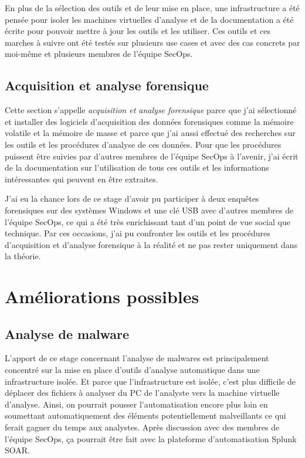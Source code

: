 En plus de la sélection des outils et de leur mise en place, une infrastructure a été pensée pour isoler les machines virtuelles d'analyse et de la documentation a été écrite pour pouvoir mettre à jour les outils et les utiliser. Ces outils et ces marches à suivre ont été testés sur plusieurs use cases et avec des cas concrets par moi-même et plusieurs membres de l'équipe SecOps.



\subsection{Acquisition et analyse forensique}

Cette section s'appelle \textit{acquisition et analyse forensique} parce que j'ai sélectionné et installer des logiciels d'acquisition des données forensiques comme la mémoire volatile et la mémoire de masse et parce que j'ai aussi effectué des recherches sur les outils et les procédures d'analyse de ces données. Pour que les procédures puissent être suivies par d'autres membres de l'équipe SecOps à l'avenir, j'ai écrit de la documentation sur l'utilisation de tous ces outils et les informations intéressantes qui peuvent en être extraites.

J'ai eu la chance lors de ce stage d'avoir pu participer à deux enquêtes forensiques sur des systèmes Windows et une clé USB avec d'autres membres de l'équipe SecOps, ce qui a été très enrichissant tant d'un point de vue social que technique. Par ces occasions, j'ai pu confronter les outils et les procédures d'acquisition et d'analyse forensique à la réalité et ne pas rester uniquement dans la théorie.





\section{Améliorations possibles}



\subsection{Analyse de malware}

L'apport de ce stage concernant l'analyse de malwares est principalement concentré sur la mise en place d'outils d'analyse automatique dans une infrastructure isolée. Et parce que l'infrastructure est isolée, c'est plus difficile de déplacer des fichiers à analyser du PC de l'analyste vers la machine virtuelle d'analyse. Ainsi, on pourrait pousser l'automatisation encore plus loin en soumettant automatiquement des éléments potentiellement malveillants ce qui ferait gagner du temps aux analystes. Après discussion avec des membres de l'équipe SecOps, ça pourrait être fait avec la plateforme d'automatisation Splunk SOAR.

